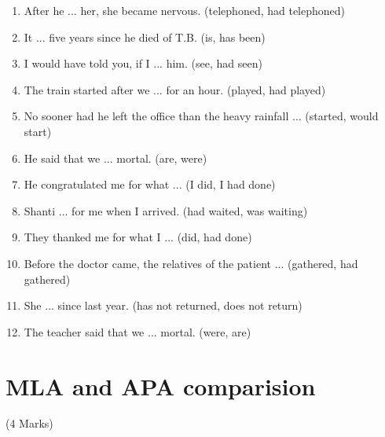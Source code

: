 \documentclass[12pt]{article}
\begin{document}
\begin{enumerate}
    \item After he ... her, she became nervous. \hfill (telephoned, had telephoned)

    \item It ... five years since he died of T.B. \hfill (is, has been)

    \item I would have told you, if I ... him. \hfill (see, had seen)

    \item The train started after we ... for an hour. \hfill (played, had played)

    \item No sooner had he left the office than the heavy rainfall ... \hfill (started, would start)

    \item He said that we ... mortal. \hfill (are, were)

    \item He congratulated me for what ... \hfill (I did, I had done)

    \item Shanti ... for me when I arrived. \hfill (had waited, was waiting)

    \item They thanked me for what I ... \hfill (did, had done)

    \item Before the doctor came, the relatives of the patient ... \hfill (gathered, had gathered)

    \item She ... since last year. \hfill (has not returned, does not return)

    \item The teacher said that we ... mortal. \hfill (were, are)

  \end{enumerate}

\pagebreak

\section{MLA and APA comparision}
  \begin{center}(4 Marks)\end{center}
  
\end{document}

